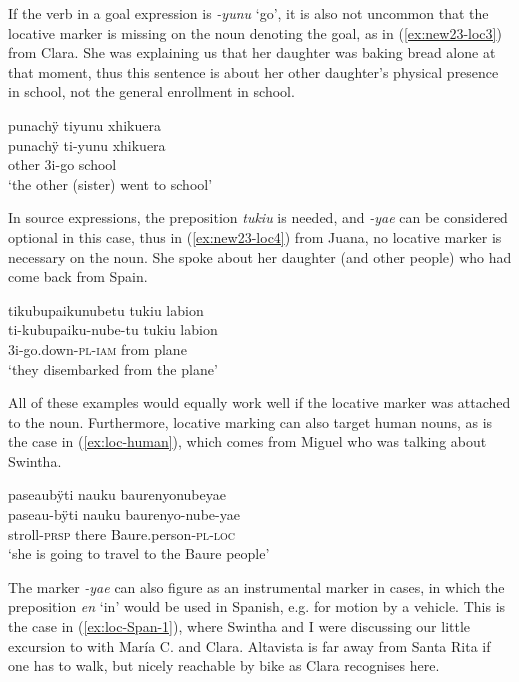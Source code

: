 If the verb in a goal expression is \textit{-yunu} ‘go’, it is also not uncommon that the locative marker is missing on the noun denoting the goal, as in (\ref{ex:new23-loc3}) from Clara. She was explaining us that her daughter was baking bread alone at that moment, thus this sentence is about her other daughter’s physical presence in school, not the general enrollment in school.

\ea\label{ex:new23-loc3}
\begingl
\glpreamble punachÿ tiyunu xhikuera\\
\gla punachÿ ti-yunu xhikuera\\
\glb other 3i-go school\\
\glft ‘the other (sister) went to school’
\endgl
\trailingcitation{[cux-120410ls.220]}
\xe

In source expressions, the preposition \textit{tukiu} is needed, and \textit{-yae} can be considered optional in this case, thus in (\ref{ex:new23-loc4}) from Juana, no locative marker is necessary on the noun. She spoke about her daughter (and other people) who had come back from Spain.

\ea\label{ex:new23-loc4}
\begingl
\glpreamble tikubupaikunubetu tukiu labion\\
\gla ti-kubupaiku-nube-tu tukiu labion\\
\glb 3i-go.down-\textsc{pl}-\textsc{iam} from plane\\
\glft ‘they disembarked from the plane’
\endgl
\trailingcitation{[jxx-p120430l-1.266]}
\xe
{}


All of these examples would equally work well if the locative marker was attached to the noun. Furthermore, locative marking can also target human nouns, as is the case in (\ref{ex:loc-human}), which comes from Miguel who was talking about Swintha.

\ea\label{ex:loc-human}
\begingl
\glpreamble paseaubÿti nauku baurenyonubeyae\\
\gla paseau-bÿti nauku baurenyo-nube-yae\\
\glb stroll-\textsc{prsp} there Baure.person-\textsc{pl}-\textsc{loc}\\
\glft ‘she is going to travel to the Baure people’
\endgl
\trailingcitation{[mxx-d110813s-2.066]}
\xe

The marker \textit{-yae} can also figure as an instrumental marker in cases, in which the preposition \textit{en} ‘in’ would be used in Spanish, e.g. for motion by a vehicle. This is the case in (\ref{ex:loc-Span-1}), where Swintha and I were discussing our little excursion to  with María C. and Clara. Altavista is far away from Santa Rita if one has to walk, but nicely reachable by bike as Clara recognises here.

